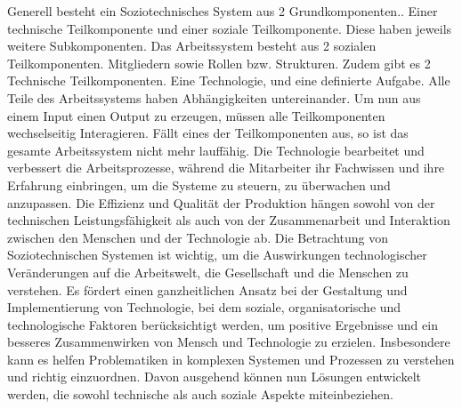 \documentclass[journal=tosc,final]{iacrtrans}
\begin{document}
Generell besteht ein Soziotechnisches System aus 2 Grundkomponenten.. Einer technische Teilkomponente und einer soziale Teilkomponente. Diese haben jeweils weitere Subkomponenten. Das Arbeitssystem besteht aus 2 sozialen Teilkomponenten. Mitgliedern sowie Rollen bzw. Strukturen. Zudem gibt es 2 Technische Teilkomponenten. Eine Technologie, und eine definierte Aufgabe. Alle Teile des Arbeitssystems haben Abhängigkeiten untereinander. Um nun aus einem Input einen Output zu erzeugen, müssen alle Teilkomponenten wechselseitig Interagieren. Fällt eines der Teilkomponenten aus, so ist das gesamte Arbeitssystem nicht mehr lauffähig. Die Technologie bearbeitet und verbessert die Arbeitsprozesse, während die Mitarbeiter ihr Fachwissen und ihre Erfahrung einbringen, um die Systeme zu steuern, zu überwachen und anzupassen. Die Effizienz und Qualität der Produktion hängen sowohl von der technischen Leistungsfähigkeit als auch von der Zusammenarbeit und Interaktion zwischen den Menschen und der Technologie ab. Die Betrachtung von Soziotechnischen Systemen ist wichtig, um die Auswirkungen technologischer Veränderungen auf die Arbeitswelt, die Gesellschaft und die Menschen zu verstehen. Es fördert einen ganzheitlichen Ansatz bei der Gestaltung und Implementierung von Technologie, bei dem soziale, organisatorische und technologische Faktoren berücksichtigt werden, um positive Ergebnisse und ein besseres Zusammenwirken von Mensch und Technologie zu erzielen. Insbesondere kann es helfen Problematiken in komplexen Systemen und Prozessen zu verstehen und richtig einzuordnen. Davon ausgehend können nun Lösungen entwickelt werden, die sowohl technische als auch soziale Aspekte miteinbeziehen.  
\newpage
\end{document}
